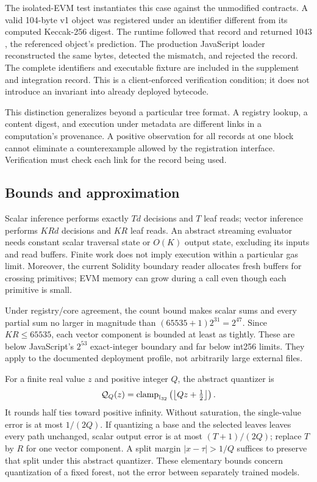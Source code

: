 \documentclass{ledger}
\newcommand{\Ithirtytwo}{\mathbb{I}_{32}}
\begin{document}
The isolated-EVM test instantiates this case against the unmodified contracts.
A valid 104-byte v1 object was registered under an identifier different from
its computed Keccak-256 digest. The runtime followed that record and returned
$1043$, the referenced object's prediction. The production JavaScript loader
reconstructed the same bytes, detected the mismatch, and rejected the record.
The complete identifiers and executable fixture are included in the
supplement and integration record. This is a client-enforced verification
condition; it does not introduce an invariant into already deployed bytecode.

This distinction generalizes beyond a particular tree format. A registry
lookup, a content digest, and execution under metadata are different links in
a computation's provenance. A positive observation for all records at one
block cannot eliminate a counterexample allowed by the registration
interface. Verification must check each link for the record being used.

\subsection{Bounds and approximation}

Scalar inference performs exactly $Td$ decisions and $T$ leaf reads; vector
inference performs $KRd$ decisions and $KR$ leaf reads. An abstract streaming
evaluator needs constant scalar traversal state or $O(K)$ output state,
excluding its inputs and read buffers. Finite work does not imply execution
within a particular gas limit. Moreover, the current Solidity boundary reader
allocates fresh buffers for crossing primitives; EVM memory can grow during
a call even though each primitive is small.

Under registry/core agreement, the count bound makes scalar sums and every
partial sum no larger
in magnitude than $(65535+1)2^{31}=2^{47}$. Since $KR\le65535$, each vector
component is bounded at least as tightly. These are below JavaScript's
$2^{53}$ exact-integer boundary and far below int256 limits. They apply to the
documented deployment profile, not arbitrarily large external files.

For a finite real value $z$ and positive integer $Q$, the abstract quantizer is
\begin{equation}
 {\cal Q}_Q(z)=\operatorname{clamp}_{\Ithirtytwo}
 \left(\left\lfloor Qz+\tfrac12\right\rfloor\right).
 \label{eq:quantizer}
\end{equation}
It rounds half ties toward positive infinity. Without saturation, the
single-value error is at most $1/(2Q)$. If quantizing a base and the selected
leaves leaves every path unchanged, scalar output error is at most
$(T+1)/(2Q)$; replace $T$ by $R$ for one vector component. A split margin
$|x-\tau|>1/Q$ suffices to preserve that split under this abstract quantizer.
These elementary bounds concern quantization of a fixed forest, not the error
between separately trained models.
\end{document}
